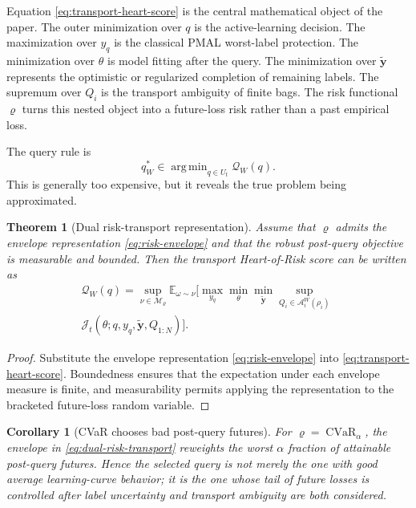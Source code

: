 \documentclass[10pt,journal]{IEEEtran}
\newtheorem{theorem}{Theorem}
\newtheorem{corollary}{Corollary}
\DeclareMathOperator*{\argmin}{arg\,min}
\DeclareMathOperator{\CVaR}{CVaR}
\newcommand{\E}{\mathbb{E}}
\newcommand{\Jcal}{\mathcal{J}}
\newcommand{\Mcal}{\mathcal{M}}
\newcommand{\risk}{\varrho}
\newcommand{\Qcal}{\mathcal{Q}}
\newcommand{\Acal}{\mathcal{A}}
\begin{document}
Equation \eqref{eq:transport-heart-score} is the central mathematical object of the paper. The outer minimization over $q$ is the active-learning decision. The maximization over $y_q$ is the classical PMAL worst-label protection. The minimization over $\theta$ is model fitting after the query. The minimization over $\tilde{\mathbf y}$ represents the optimistic or regularized completion of remaining labels. The supremum over $Q_i$ is the transport ambiguity of finite bags. The risk functional $\risk$ turns this nested object into a future-loss risk rather than a past empirical loss.

The query rule is
\begin{equation}
\label{eq:transport-heart-query}
    q_W^*\in\argmin_{q\in U_t}\Qcal_W(q).
\end{equation}
This is generally too expensive, but it reveals the true problem being approximated.


\begin{theorem}[Dual risk-transport representation]
\label{thm:dual-risk-transport}
Assume that $\risk$ admits the envelope representation \eqref{eq:risk-envelope} and that the robust post-query objective is measurable and bounded. Then the transport Heart-of-Risk score can be written as
\begin{multline}
\label{eq:dual-risk-transport}
\Qcal_W(q)=
\sup_{\nu\in\Mcal_\risk}\E_{\omega\sim\nu}\Bigg[
\max_{y_q}\min_\theta\min_{\tilde{\mathbf y}}
\sup_{Q_i\in\Acal_i^W(\rho_i)}\ \\[-0.2em]
\Jcal_t(\theta;q,y_q,\tilde{\mathbf y},Q_{1:N})\Bigg].
\end{multline}
\end{theorem}

\begin{proof}
Substitute the envelope representation \eqref{eq:risk-envelope} into \eqref{eq:transport-heart-score}. Boundedness ensures that the expectation under each envelope measure is finite, and measurability permits applying the representation to the bracketed future-loss random variable.
\end{proof}

\begin{corollary}[CVaR chooses bad post-query futures]
\label{cor:cvar-post-query}
For $\risk=\CVaR_\alpha$, the envelope in \eqref{eq:dual-risk-transport} reweights the worst $\alpha$ fraction of attainable post-query futures. Hence the selected query is not merely the one with good average learning-curve behavior; it is the one whose tail of future losses is controlled after label uncertainty and transport ambiguity are both considered.
\end{corollary}
\end{document}
